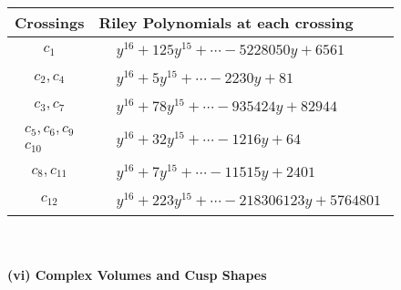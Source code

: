 \documentclass[1p]{elsarticle_modified}
\theoremstyle{definition}
\begin{document}
\begin{tabular}{m{50pt}|m{274pt}}
Crossings & \hspace{64pt}Riley Polynomials at each crossing \\
\hline $$\begin{aligned}c_{1}\end{aligned}$$&$\begin{aligned}
&y^{16}+125 y^{15}+\cdots-5228050 y+6561
\end{aligned}$\\
\hline $$\begin{aligned}c_{2},c_{4}\end{aligned}$$&$\begin{aligned}
&y^{16}+5 y^{15}+\cdots-2230 y+81
\end{aligned}$\\
\hline $$\begin{aligned}c_{3},c_{7}\end{aligned}$$&$\begin{aligned}
&y^{16}+78 y^{15}+\cdots-935424 y+82944
\end{aligned}$\\
\hline $$\begin{aligned}c_{5},c_{6},c_{9}\\c_{10}\end{aligned}$$&$\begin{aligned}
&y^{16}+32 y^{15}+\cdots-1216 y+64
\end{aligned}$\\
\hline $$\begin{aligned}c_{8},c_{11}\end{aligned}$$&$\begin{aligned}
&y^{16}+7 y^{15}+\cdots-11515 y+2401
\end{aligned}$\\
\hline $$\begin{aligned}c_{12}\end{aligned}$$&$\begin{aligned}
&y^{16}+223 y^{15}+\cdots-218306123 y+5764801
\end{aligned}$\\
\hline
\end{tabular}\\~\\
\newpage\flushleft \textbf{(vi) Complex Volumes and Cusp Shapes}
\end{document}
